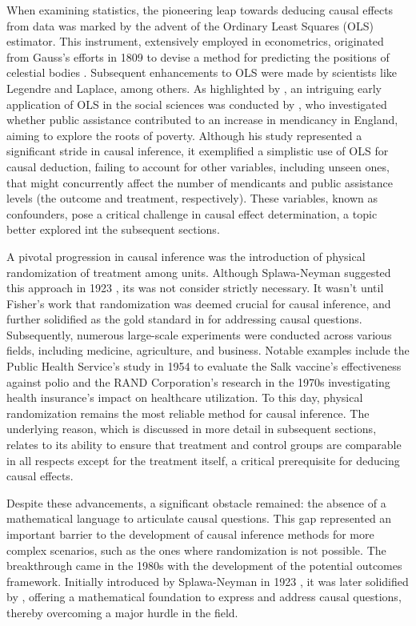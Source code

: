 When examining statistics, the pioneering leap towards deducing causal effects from data was marked by the advent of the Ordinary Least Squares
(OLS) estimator. This instrument, extensively employed in econometrics, originated from Gauss's efforts in 1809 to devise a method for 
predicting the positions of celestial bodies \parencite{gauss_c_f_theoria_1809}. Subsequent enhancements to OLS were made by scientists like 
Legendre and Laplace, among others. As highlighted by \textcite{cunningham_causal_2021}, an intriguing early application of OLS in the social 
sciences was conducted by \textcite{yule_investigation_1899}, who investigated whether public assistance contributed to an increase in 
mendicancy in England, aiming to explore the roots of poverty. Although his study represented a significant stride in causal inference, it 
exemplified a simplistic use of OLS for causal deduction, failing to account for other variables, including unseen ones, that might concurrently
affect the number of mendicants and public assistance levels (the outcome and treatment, respectively). These variables, known as confounders, pose a critical challenge in causal effect
determination, a topic better explored int the subsequent sections.

A pivotal progression in causal inference was the introduction of physical randomization of treatment among units. Although Splawa-Neyman suggested 
this approach in 1923 \parencite{splawa-neyman_application_1990}, its was not consider strictly necessary. It wasn't until Fisher's work \parencite{fisher_statistical_1992} 
that randomization was deemed crucial for causal inference, and further solidified as the gold standard in \textcite{fisher_design_1935} for addressing causal 
questions. Subsequently, numerous large-scale experiments were conducted across various fields, including medicine, agriculture, and business. 
Notable examples include the Public Health Service's study in 1954 to evaluate the Salk vaccine's effectiveness against polio and the RAND Corporation's 
research in the 1970s investigating health insurance's impact on healthcare utilization. To this day, physical randomization remains the most 
reliable method for causal inference. The underlying reason, which is discussed in more detail in subsequent sections, relates to its ability 
to ensure that treatment and control groups are comparable in all respects except for the treatment itself, a critical prerequisite for deducing 
causal effects.

Despite these advancements, a significant obstacle remained: the absence of a mathematical language to articulate causal questions. This gap represented an
important barrier to the development of causal inference methods for more complex scenarios, such as the ones where randomization is not possible. The breakthrough came in the 1980s 
with the development of the potential outcomes framework. Initially introduced by Splawa-Neyman in 1923 \parencite{splawa-neyman_application_1990}, it was later solidified by \textcite{rubin_estimating_1974}, 
offering a mathematical foundation to express and address causal questions, thereby overcoming a major hurdle in the field.

